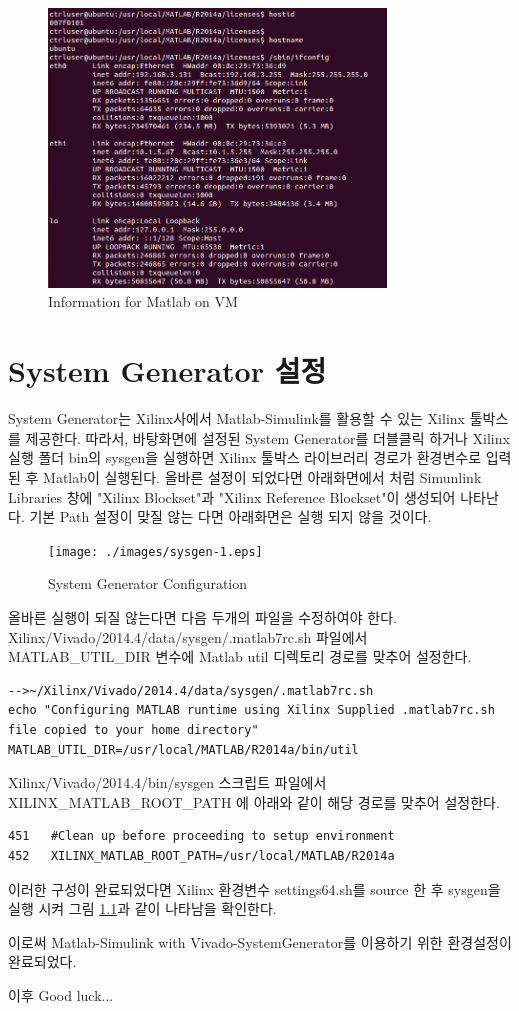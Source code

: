 \documentclass[11pt
  , a4paper
  , article
  , oneside
]{memoir}
\begin{document}
\clearpage


\begin{figure}[h!]
	\centering
	\includegraphics[width=0.8\textwidth, height=0.4\textwidth]{./images/matlab_virtual_info.png}
	\caption{Information for Matlab on VM}
	\label{fig:info_matlab_vm} 
\end{figure}

\chapter{System Generator 설정}
System Generator는 Xilinx사에서 Matlab-Simulink를 활용할 수 있는 Xilinx 툴박스를 제공한다. 따라서, 바탕화면에 설정된 System Generator를 더블클릭 하거나 Xilinx 실행 폴더 bin의 sysgen을 실행하면 Xilinx 툴박스 라이브러리 경로가 환경변수로 입력된 후 Matlab이 실행된다. 올바른 설정이 되었다면 아래화면에서 처럼 Simunlink Libraries 창에 "Xilinx Blockset"과 "Xilinx Reference Blockset"이 생성되어 나타난다. 기본 Path 설정이 맞질 않는 다면 아래화면은 실행 되지 않을 것이다.

\begin{figure}[h!]
	\centering
	\texttt{[image: ./images/sysgen-1.eps]}
	\caption{System Generator Configuration}
	\label{fig:sysgen_1} 
\end{figure}

올바른 실행이 되질 않는다면 다음 두개의 파일을 수정하여야 한다. \\
Xilinx/Vivado/2014.4/data/sysgen/.matlab7rc.sh 파일에서  MATLAB\_UTIL\_DIR 변수에 Matlab util 디렉토리 경로를 맞추어 설정한다.
\begin{lstlisting}[style=termstyle]
-->~/Xilinx/Vivado/2014.4/data/sysgen/.matlab7rc.sh
echo "Configuring MATLAB runtime using Xilinx Supplied .matlab7rc.sh file copied to your home directory"
MATLAB_UTIL_DIR=/usr/local/MATLAB/R2014a/bin/util
\end{lstlisting}

Xilinx/Vivado/2014.4/bin/sysgen 스크립트 파일에서 XILINX\_MATLAB\_ROOT\_PATH 에 아래와 같이 해당 경로를 맞추어 설정한다.

\begin{lstlisting}[style=termstyle]
451   #Clean up before proceeding to setup environment
452   XILINX_MATLAB_ROOT_PATH=/usr/local/MATLAB/R2014a
\end{lstlisting}

이러한 구성이 완료되었다면 Xilinx 환경변수 settings64.sh를 source 한 후 sysgen을 실행 시켜 그림 \ref{fig:sysgen_1}과 같이 나타남을 확인한다.

이로써 Matlab-Simulink with Vivado-SystemGenerator를 이용하기 위한 환경설정이 완료되었다.

이후 Good luck...


\clearpage


\end{document}
